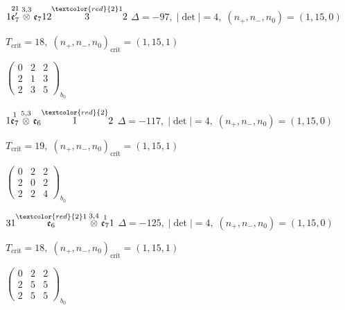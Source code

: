 \documentclass[10pt]{article}
\begin{document}
\smallskip

$1\overset{21}{\mathfrak{e}_7'}\overset{3,3}{\otimes}\mathfrak{e}_712\overset{\textcolor{red}{2}1}{3}2$ \quad $\Delta=-97,\; |\det|=4,\; (n_+,n_-,n_0)=(1,15,0)$

\hspace{1em}$T_{\text{crit}}=18,\; (n_+,n_-,n_0)_{\text{crit}}=(1,15,1)$

\hspace{2em}$\left(\begin{smallmatrix}0 & 2 & 2 \\ 2 & 1 & 3 \\ 2 & 3 & 5\end{smallmatrix}\right)_{\!b_0}$

\smallskip

$1\overset{1}{\mathfrak{e}_7}\overset{5,3}{\otimes}\mathfrak{e}_6\overset{\textcolor{red}{2}}{1}2$ \quad $\Delta=-117,\; |\det|=4,\; (n_+,n_-,n_0)=(1,15,0)$

\hspace{1em}$T_{\text{crit}}=19,\; (n_+,n_-,n_0)_{\text{crit}}=(1,15,1)$

\hspace{2em}$\left(\begin{smallmatrix}0 & 2 & 2 \\ 2 & 0 & 2 \\ 2 & 2 & 4\end{smallmatrix}\right)_{\!b_0}$

\smallskip

$31\overset{\textcolor{red}{2}1}{\mathfrak{e}_6}\overset{3,4}{\otimes}\overset{1}{\mathfrak{e}_7}1$ \quad $\Delta=-125,\; |\det|=4,\; (n_+,n_-,n_0)=(1,15,0)$

\hspace{1em}$T_{\text{crit}}=18,\; (n_+,n_-,n_0)_{\text{crit}}=(1,15,1)$

\hspace{2em}$\left(\begin{smallmatrix}0 & 2 & 2 \\ 2 & 5 & 5 \\ 2 & 5 & 5\end{smallmatrix}\right)_{\!b_0}$

\smallskip
\end{document}
